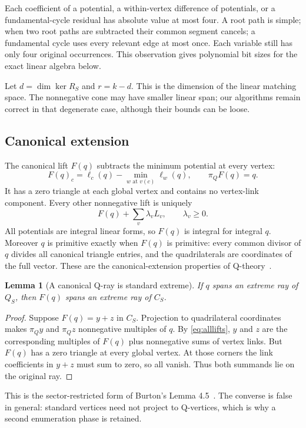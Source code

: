 \documentclass[11pt]{article}
\newtheorem{lemma}[theorem]{Lemma}
\theoremstyle{definition}
\theoremstyle{remark}
\begin{document}
Each coefficient of a potential, a within-vertex difference of potentials,
or a fundamental-cycle residual has absolute value at most four. A root path
is simple; when two root paths are subtracted their common segment cancels;
a fundamental cycle uses every relevant edge at most once. Each variable
still has only four original occurrences. This observation gives polynomial
bit sizes for the exact linear algebra below.

Let $d=\dim\ker R_S$ and $r=k-d$. This is the dimension of the linear matching
space. The nonnegative cone may have smaller linear span; our algorithms
remain correct in that degenerate case, although their bounds can be loose.

\subsection{Canonical extension}

The canonical lift $F(q)$ subtracts the minimum potential at every vertex:
\begin{equation}
 F(q)_c=\ell_c(q)-\min_{w\text{ at }v(c)}\ell_w(q),
 \qquad \pi_QF(q)=q.
 \label{eq:canonical}
\end{equation}
It has a zero triangle at each global vertex and contains no vertex-link
component. Every other nonnegative lift is uniquely
\begin{equation}
 F(q)+\sum_v\lambda_vL_v,\qquad \lambda_v\ge0.
 \label{eq:alllifts}
\end{equation}
All potentials are integral linear forms, so $F(q)$ is integral for integral
$q$. Moreover $q$ is primitive exactly when $F(q)$ is primitive: every common
divisor of $q$ divides all canonical triangle entries, and the quadrilaterals
are coordinates of the full vector. These are the canonical-extension
properties of Q-theory~\cite{tollefson,burton2009}.

\begin{lemma}[A canonical Q-ray is standard extreme]
\label{lem:qstandard}
If $q$ spans an extreme ray of $Q_S$, then $F(q)$ spans an extreme ray of $C_S$.
\end{lemma}
\begin{proof}
Suppose $F(q)=y+z$ in $C_S$. Projection to quadrilateral coordinates makes
$\pi_Qy$ and $\pi_Qz$ nonnegative multiples of $q$. By
\eqref{eq:alllifts}, $y$ and $z$ are the corresponding multiples of $F(q)$
plus nonnegative sums of vertex links. But $F(q)$ has a zero triangle at
every global vertex. At those corners the link coefficients in $y+z$ must
sum to zero, so all vanish. Thus both summands lie on the original ray.
\end{proof}
This is the sector-restricted form of Burton's Lemma 4.5~\cite{burton2009}.
The converse is false in general: standard vertices need not project to
Q-vertices, which is why a second enumeration phase is retained.
\end{document}
